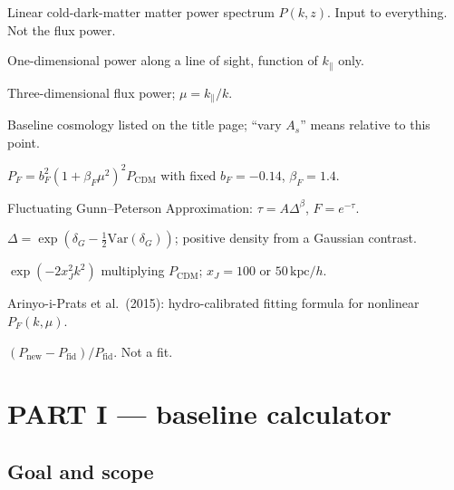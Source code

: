 \documentclass[11pt]{article}
\begin{document}
\begin{description}[style=nextline,leftmargin=1.2em]
\item[$P_\mathrm{CDM}$]
Linear cold-dark-matter matter power spectrum $P(k,z)$.
Input to everything. Not the flux power.

\item[$P_{1\mathrm{D}}$]
One-dimensional power along a line of sight, function of $k_\parallel$ only.

\item[$P_F(k,\mu)$]
Three-dimensional flux power; $\mu=k_\parallel/k$.

\item[Fiducial]
Baseline cosmology listed on the title page; ``vary $A_s$'' means relative to this point.

\item[Kaiser]
$P_F=b_F^{2}(1+\beta_F\mu^{2})^{2}P_\mathrm{CDM}$ with fixed $b_F=-0.14$, $\beta_F=1.4$.

\item[FGPA]
Fluctuating Gunn--Peterson Approximation: $\tau=A\Delta^{\beta}$, $F=e^{-\tau}$.

\item[Lognormal]
$\Delta=\exp(\delta_G-\tfrac12\mathrm{Var}(\delta_G))$; positive density from a Gaussian contrast.

\item[Jeans / pressure]
$\exp(-2 x_J^{2} k^{2})$ multiplying $P_\mathrm{CDM}$; $x_J=100$ or $50\,\mathrm{kpc}/h$.

\item[Arinyo]
Arinyo-i-Prats et al.\ (2015): hydro-calibrated fitting formula for nonlinear $P_F(k,\mu)$.

\item[Fractional change]
$(P_{\mathrm{new}}-P_{\mathrm{fid}})/P_{\mathrm{fid}}$. Not a fit.
\end{description}

\newpage
\section{PART I --- baseline calculator}

\subsection{Goal and scope}
\end{document}
